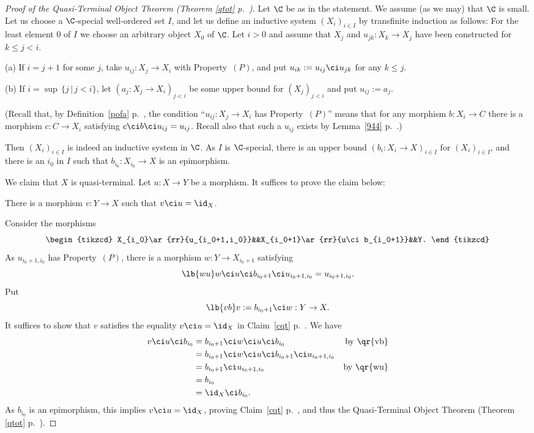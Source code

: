 \documentclass[12pt]{article}
\theoremstyle{remark}
\theoremstyle{definition}
\begin{document}
\begin{proof}[Proof of the Quasi-Terminal Object Theorem (Theorem \ref{qtot} p.~)] 
Let $\C$ be as in the statement. We assume (as we may) that $\C$ is small. Let us choose a $\C$-special well-ordered set $I$, and let us define an inductive system $(X_i)_{i\in I}$ by transfinite induction as follows: For the least element $0$ of $I$ we choose an arbitrary object $X_0$ of $\C$. Let $i>0$ and assume that $X_j$ and $u_{jk}:X_k\to X_j$ have been constructed for $k\le j<i$. 

\nn(a) If $i=j+1$ for some $j$, take $u_{ij}:X_j\to X_i$ with Property~$(P)$, and put $u_{ik}:=u_{ij}\ci u_{jk}$ for any $k\le j$. 

\nn(b) If $i=\sup\,\{j\,|\,j<i\}$, let $(a_j:X_j\to X_i)_{j<i}$ be some upper bound for $(X_j)_{j<i}$ and put $u_{ij}:=a_j$. 

(Recall that, by Definition~\ref{pofa} p.~, the condition ``$u_{ij}:X_j\to X_i$ has Property~$(P)$'' means that for any morphism $b:X_i\to C$ there is a morphism $c:C\to X_i$ satisfying $c\ci b\ci u_{ij}=u_{ij}$. Recall also that such a $u_{ij}$ exists by Lemma~\ref{944} p.~.) 

Then $(X_i)_{i\in I}$ is indeed an inductive system in $\C$. As $I$ is $\C$-special, there is an upper bound $(b_i:X_i\to X)_{i\in I}$ for $(X_i)_{i\in I}$, and there is an $i_0$ in $I$ such that $b_{i_0}:X_{i_0}\to X$ is an epimorphism. 

We claim that $X$ is quasi-terminal. Let $u:X\to Y$ be a morphism. It suffices to prove the claim below: 
%
\begin{claim}
There is a morphism $v:Y\to X$ such that $v\ci u=\id_X$. 
\end{claim} 

Consider the morphisms 
$$
\begin{tikzcd}
X_{i_0}\ar{rr}{u_{i_0+1,i_0}}&&X_{i_0+1}\ar{rr}{u\ci b_{i_0+1}}&&Y.
\end{tikzcd}
$$
As $u_{i_0+1,i_0}$ has Property~$(P)$, there is a morphism $w:Y\to X_{i_0+1}$ satisfying  
%
\begin{equation}\lb{wu}
w\ci u\ci b_{i_0+1}\ci u_{i_0+1,i_0}=u_{i_0+1,i_0}.
\end{equation}  
% 
Put
%
\begin{equation}\lb{vb}
v:=b_{i_0+1}\ci w:Y\to X.
\end{equation}
%
It suffices to show that $v$ satisfies the equality $v\ci u=\id_X$ in Claim~\ref{cqt} p.~. We have 
%
\begin{align*}
v\ci u\ci b_{i_0}&=b_{i_0+1}\ci w\ci u\ci b_{i_0}&\text{by \qr{vb}}\\ 
&=b_{i_0+1}\ci w\ci u\ci b_{i_0+1}\ci u_{i_0+1,i_0}\\ 
&=b_{i_0+1}\ci u_{i_0+1,i_0}&\text{by \qr{wu}}\\ 
&=b_{i_0}\\ 
&=\id_X\ci b_{i_0}. 
\end{align*}
%
As $b_{i_0}$ is an epimorphism, this implies $v\ci u=\id_X$, proving Claim~\ref{cqt} p.~, and thus the Quasi-Terminal Object Theorem (Theorem \ref{qtot} p.~). 
\end{proof}
\end{document}
